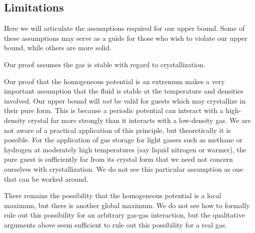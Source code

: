 \documentclass{nature}
\newcommand{\blue}[1]{{\bf \color{blue} #1}}
\newcommand{\davidsays}[1]{{\color{red} [\blue{D:} \emph{#1}]}}
\begin{document}

\subsection*{Limitations}
Here we will articulate the assumptions required for our upper bound.  Some of these assumptions may serve as a guide for those who wish to violate our upper bound, while others are more solid.

\begin{limitation}\label{limit:crystallization}
Our proof assumes the gas is stable with regard to crystallization.
\end{limitation}

Our proof that the homogeneous potential is an extremum makes a very important assumption that the fluid is stable at the temperature and densities involved.  Our upper bound will \emph{not} be valid for guests which may crystallize in their pure form.  This is because a periodic potential can interact with a high-density crystal far more strongly than it interacts with a low-density gas.  We are not aware of a practical application of this principle, but theoretically it is possible.  For the application of gas storage for light gasses such as methane or hydrogen at moderately high temperatures (say liquid nitrogen or warmer), the pure guest is sufficiently far from its crystal form that we need not concern ourselves with crystallization.  We do not see this particular assumption as one that can be worked around.

There remains the possibility that the homogeneous potential is a local maximum, but there is another global maximum.  We do not see how to formally rule out this possibility for an arbitrary gas-gas interaction, but the qualitative arguments above seem sufficient to rule out this possibility for a real gas.
\end{document}

